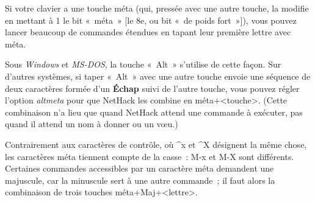 \documentclass[titlepage]{article}
\begin{document}
Si votre clavier a une touche méta (qui, pressée avec une autre touche, la
modifie en mettant à 1 le bit «~méta~» [le 8e, ou bit «~de
poids fort~»]), vous pouvez lancer beaucoup de commandes étendues en
tapant leur première lettre avec méta.


Sous \textit{Windows} et \textit{MS-DOS}, la touche «~Alt~» s'utilise de
cette façon.
Sur d'autres systèmes, si taper «~Alt~» avec une autre touche envoie
une séquence de deux caractères formée d'un \textbf{Échap} suivi de l'autre
touche, vous pouvez régler l'option
\textit{altmeta}
pour que NetHack les combine en méta+\textless{}touche\textgreater{}.
(Cette combinaison n'a lieu que quand NetHack attend une commande à
exécuter, pas quand il attend un nom à donner ou un vœu.)


Contrairement aux caractères de contrôle, où \textasciicircum{}x et \textasciicircum{}X désignent la
même chose, les caractères méta tiennent compte de la casse~: M-x et M-X
sont différents.
Certaines commandes accessibles par un caractère méta demandent une
majuscule, car la minuscule sert à une autre commande~; il faut alors la
combinaison de trois touches méta+Maj+\textless{}lettre\textgreater{}.
\medskip
\end{document}
